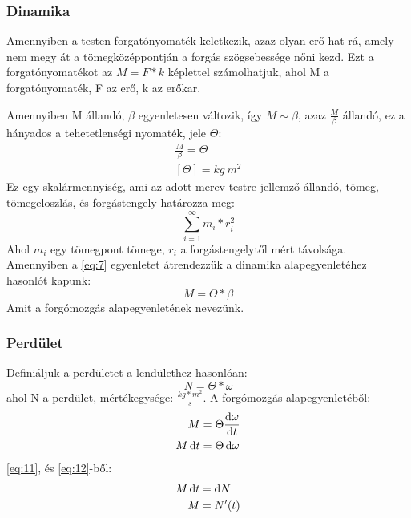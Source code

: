 \documentclass[twoside]{article}
\begin{document}
		\subsubsection{Dinamika}
			Amennyiben a testen forgatónyomaték keletkezik, azaz olyan erő hat rá, amely nem megy át a tömegközéppontján a forgás szögsebessége nőni kezd. Ezt a forgatónyomatékot az $M=F*k$ képlettel számolhatjuk, ahol M a forgatónyomaték, F az erő, k az erőkar.
			
			Amennyiben M állandó, $\beta$ egyenletesen változik, így $M\sim\beta$, azaz $\frac{M}{\beta}$ állandó, ez a hányados a tehetetlenségi nyomaték, jele $\Theta$:
			\begin{gather}
				\frac{M}{\beta}=\Theta\label{eq:7}\\
				[\Theta]=kg\ m^2\label{eq:8}
			\end{gather}
			Ez egy skalármennyiség, ami az adott merev testre jellemző állandó, tömeg, tömegeloszlás, és forgástengely határozza meg:
			\begin{equation}
				\sum_{i=1}^{\infty} m_i*r_i^2\label{eq:9}
			\end{equation}
			Ahol $m_i$ egy tömegpont tömege, $r_i$ a forgástengelytől mért távolsága. Amennyiben a \eqref{eq:7} egyenletet átrendezzük a dinamika alapegyenletéhez hasonlót kapunk:
			\begin{equation}
				M=\Theta*\beta\label{eq:10}
			\end{equation}
			Amit a forgómozgás alapegyenletének nevezünk.
		\subsubsection{Perdület}
			Definiáljuk a perdületet a lendülethez hasonlóan: 
			\begin{equation}
				N=\Theta*\omega\label{eq:11}
			\end{equation}
		 	ahol N a perdület, mértékegysége: $\frac{kg*m^2}{s}$. A forgómozgás alapegyenletéből:
			\begin{align}
				\nonumber M&=\Theta\frac{\dif\omega}{\dif t}\\
				M\dif t&=\Theta\dif\omega\label{eq:12}
			\end{align}
			\eqref{eq:11}, és \eqref{eq:12}-ből:
			\begin{align}
				M\dif t&=\dif N\label{eq:13}\\
				M&=N'(t)\label{eq:14}
			\end{align}
			
\end{document}
